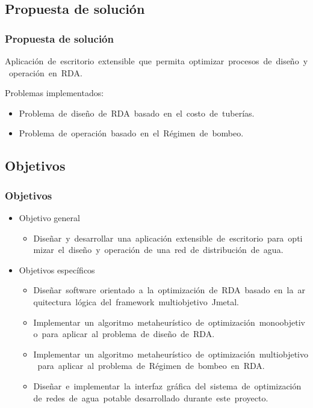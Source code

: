 \documentclass[9pt]{beamer}
\begin{document}
    \subsection{Propuesta de solución}
    \begin{frame}
        \frametitle{Propuesta de solución}
        Aplicación de escritorio extensible que permita optimizar procesos de diseño y operación en RDA.

        Problemas implementados:
        \begin{itemize}
            \item Problema de diseño de RDA basado en el costo de tuberías.
            \item Problema de operación basado en el Régimen de bombeo.
        \end{itemize}
    \end{frame}

    \subsection{Objetivos}
    \begin{frame}
        \frametitle{Objetivos}
        
        \begin{itemize}
            \item Objetivo general    
            \begin{itemize}
                \item Diseñar y desarrollar una aplicación extensible de escritorio para optimizar el diseño y operación de una red de distribución de agua.
            \end{itemize}

            \item Objetivos específicos
            \begin{itemize}
                \item Diseñar software orientado a la optimización de RDA basado en la arquitectura lógica del framework multiobjetivo Jmetal.
                \item Implementar un algoritmo metaheurístico de optimización monoobjetivo para aplicar al problema de diseño de RDA.
                \item Implementar un algoritmo metaheurístico de optimización multiobjetivo para aplicar al problema de Régimen de bombeo en RDA.
                \item Diseñar e implementar la interfaz gráfica del sistema de optimización de redes de agua potable desarrollado durante este proyecto.
            \end{itemize}
        \end{itemize}
    \end{frame}
\end{document}
